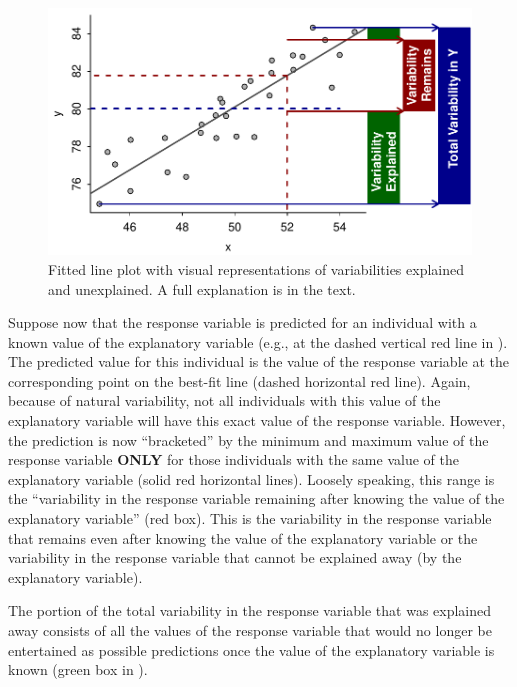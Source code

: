 \documentclass[10pt,openany]{book}\usepackage[]{graphicx}\usepackage[]{color}
\newenvironment{knitrout}{}{} %
\begin{document}
\begin{knitrout}
\color{fgcolor}\begin{figure}[hbtp]

{\centering \includegraphics[width=.8\linewidth]{Figs/CoeffDeterm-1} 

}

\caption[Fitted line plot with visual representations of variabilities explained and unexplained]{Fitted line plot with visual representations of variabilities explained and unexplained. A full explanation is in the text.}\label{fig:CoeffDeterm}
\end{figure}


\end{knitrout}

Suppose now that the response variable is predicted for an individual with a known value of the explanatory variable (e.g., at the dashed vertical red line in ). The predicted value for this individual is the value of the response variable at the corresponding point on the best-fit line (dashed horizontal red line). Again, because of natural variability, not all individuals with this value of the explanatory variable will have this exact value of the response variable. However, the prediction is now ``bracketed'' by the minimum and maximum value of the response variable \textbf{ONLY} for those individuals with the same value of the explanatory variable (solid red horizontal lines). Loosely speaking, this range is the ``variability in the response variable remaining after knowing the value of the explanatory variable'' (red box). This is the variability in the response variable that remains even after knowing the value of the explanatory variable or the variability in the response variable that cannot be explained away (by the explanatory variable).

The portion of the total variability in the response variable that was explained away consists of all the values of the response variable that would no longer be entertained as possible predictions once the value of the explanatory variable is known (green box in ).
\end{document}
